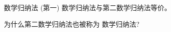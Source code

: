 \begin{frame}{}
  \begin{exampleblock}{数学归纳法}
    (第一) 数学归纳法与第二数学归纳法等价。
  \end{exampleblock}

  \vspace{0.50cm}
  \pause
  \centerline{ 为什么第二数学归纳法也被称为 数学归纳法?}

\end{frame}

%   
